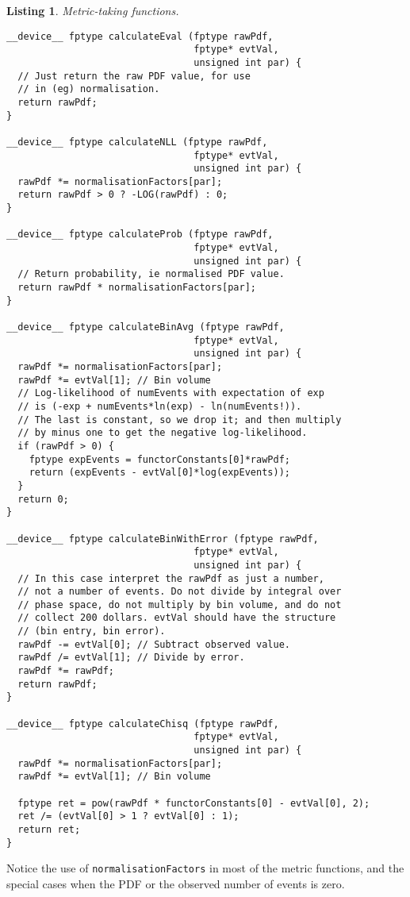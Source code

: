 \documentclass[12pt,pdflatex]{article}
\newtheorem{listing}{Listing}
\begin{document}
\begin{listing}
\label{listing:metrics}
Metric-taking functions.

\begin{verbatim}
__device__ fptype calculateEval (fptype rawPdf, 
                                 fptype* evtVal, 
                                 unsigned int par) {
  // Just return the raw PDF value, for use 
  // in (eg) normalisation. 
  return rawPdf; 
}

__device__ fptype calculateNLL (fptype rawPdf, 
                                 fptype* evtVal, 
                                 unsigned int par) {
  rawPdf *= normalisationFactors[par];
  return rawPdf > 0 ? -LOG(rawPdf) : 0; 
}

__device__ fptype calculateProb (fptype rawPdf, 
                                 fptype* evtVal, 
                                 unsigned int par) {
  // Return probability, ie normalised PDF value.
  return rawPdf * normalisationFactors[par];
}

__device__ fptype calculateBinAvg (fptype rawPdf, 
                                 fptype* evtVal, 
                                 unsigned int par) {
  rawPdf *= normalisationFactors[par];
  rawPdf *= evtVal[1]; // Bin volume 
  // Log-likelihood of numEvents with expectation of exp 
  // is (-exp + numEvents*ln(exp) - ln(numEvents!)). 
  // The last is constant, so we drop it; and then multiply 
  // by minus one to get the negative log-likelihood. 
  if (rawPdf > 0) {
    fptype expEvents = functorConstants[0]*rawPdf;
    return (expEvents - evtVal[0]*log(expEvents)); 
  }
  return 0; 
}

__device__ fptype calculateBinWithError (fptype rawPdf, 
                                 fptype* evtVal, 
                                 unsigned int par) {
  // In this case interpret the rawPdf as just a number, 
  // not a number of events. Do not divide by integral over 
  // phase space, do not multiply by bin volume, and do not 
  // collect 200 dollars. evtVal should have the structure 
  // (bin entry, bin error). 
  rawPdf -= evtVal[0]; // Subtract observed value.
  rawPdf /= evtVal[1]; // Divide by error.
  rawPdf *= rawPdf; 
  return rawPdf; 
}

__device__ fptype calculateChisq (fptype rawPdf, 
                                 fptype* evtVal, 
                                 unsigned int par) {
  rawPdf *= normalisationFactors[par];
  rawPdf *= evtVal[1]; // Bin volume 

  fptype ret = pow(rawPdf * functorConstants[0] - evtVal[0], 2);
  ret /= (evtVal[0] > 1 ? evtVal[0] : 1); 
  return ret;
}
\end{verbatim}
\end{listing}
Notice the use of \verb|normalisationFactors| in most of the metric functions,
and the special cases when the PDF or the observed number of events is zero. 
\end{document}
